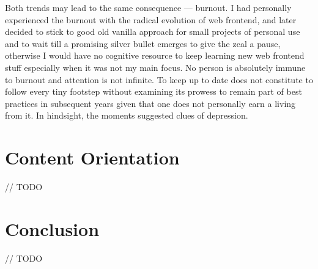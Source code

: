 Both trends may lead to the same consequence --- burnout.
I had personally experienced the burnout with the radical evolution of web frontend,
and later decided to stick to good old vanilla approach for small projects of personal use
and to wait till a promising silver bullet emerges to give the zeal a pause,
otherwise I would have no cognitive resource to keep learning new web frontend stuff
especially when it was not my main focus.
No person is absolutely immune to burnout and attention is not infinite.
To keep up to date does not constitute to follow every tiny footstep
without examining its prowess to remain part of best practices in subsequent years
given that one does not personally earn a living from it.
In hindsight, the moments suggested clues of depression.


\section{Content Orientation}
// TODO


\section{Conclusion}
// TODO



\printbibliography
